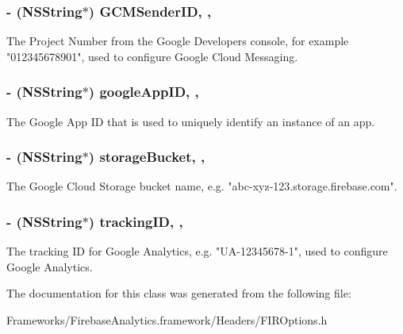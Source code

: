\subsubsection[{G\+C\+M\+Sender\+I\+D}]{\setlength{\rightskip}{0pt plus 5cm}-\/ (N\+S\+String$\ast$) G\+C\+M\+Sender\+I\+D\hspace{0.3cm}{\ttfamily [read]}, {\ttfamily [nonatomic]}, {\ttfamily [copy]}}\label{interface_f_i_r_options_a9b1714f84847f9d9883a60b3d3e855c2}
The Project Number from the Google Developer\textquotesingle{}s console, for example "012345678901", used to configure Google Cloud Messaging. \hypertarget{interface_f_i_r_options_a84adb493d4f16a271904aa731e56f013}{}
\subsubsection[{google\+App\+I\+D}]{\setlength{\rightskip}{0pt plus 5cm}-\/ (N\+S\+String$\ast$) google\+App\+I\+D\hspace{0.3cm}{\ttfamily [read]}, {\ttfamily [nonatomic]}, {\ttfamily [copy]}}\label{interface_f_i_r_options_a84adb493d4f16a271904aa731e56f013}
The Google App I\+D that is used to uniquely identify an instance of an app. \hypertarget{interface_f_i_r_options_a53cff0d6c7dfec85412f2e0c345ad7fc}{}
\subsubsection[{storage\+Bucket}]{\setlength{\rightskip}{0pt plus 5cm}-\/ (N\+S\+String$\ast$) storage\+Bucket\hspace{0.3cm}{\ttfamily [read]}, {\ttfamily [nonatomic]}, {\ttfamily [copy]}}\label{interface_f_i_r_options_a53cff0d6c7dfec85412f2e0c345ad7fc}
The Google Cloud Storage bucket name, e.\+g. "abc-\/xyz-\/123.\+storage.\+firebase.\+com". \hypertarget{interface_f_i_r_options_a2e37086e6f2db962592c21c467b1da26}{}
\subsubsection[{tracking\+I\+D}]{\setlength{\rightskip}{0pt plus 5cm}-\/ (N\+S\+String$\ast$) tracking\+I\+D\hspace{0.3cm}{\ttfamily [read]}, {\ttfamily [nonatomic]}, {\ttfamily [copy]}}\label{interface_f_i_r_options_a2e37086e6f2db962592c21c467b1da26}
The tracking I\+D for Google Analytics, e.\+g. "U\+A-\/12345678-\/1", used to configure Google Analytics. 

The documentation for this class was generated from the following file\+:\begin{DoxyCompactItemize}
\item 
Frameworks/\+Firebase\+Analytics.\+framework/\+Headers/F\+I\+R\+Options.\+h\end{DoxyCompactItemize}
